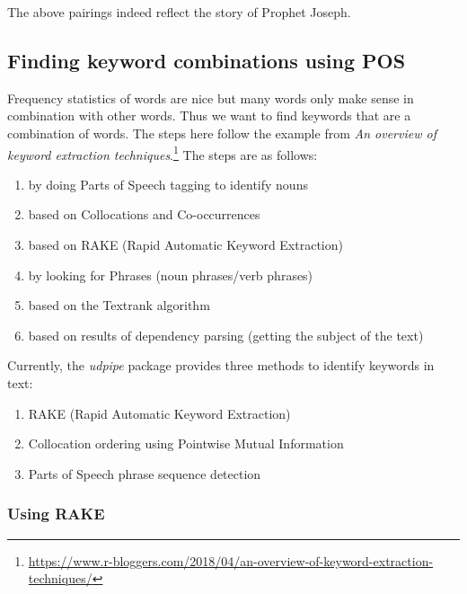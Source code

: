 \documentclass[
]{article}
\providecommand{\tightlist}{%
  \setlength{\itemsep}{0pt}\setlength{\parskip}{0pt}}
\begin{document}
\normalsize

The above pairings indeed reflect the story of Prophet Joseph.

\hypertarget{finding-keyword-combinations-using-POS}{%
\subsection{Finding keyword combinations using POS}\label{finding-keyword-combinations-using-POS}}

Frequency statistics of words are nice but many words only make sense in combination with other words. Thus we want to find keywords that are a combination of words. The steps here follow the example from \emph{An overview of keyword extraction techniques}.\footnote{\url{https://www.r-bloggers.com/2018/04/an-overview-of-keyword-extraction-techniques/}} The steps are as follows:

\begin{enumerate}
\def\labelenumi{\arabic{enumi}.}
\tightlist
\item
  by doing Parts of Speech tagging to identify nouns
\item
  based on Collocations and Co-occurrences
\item
  based on RAKE (Rapid Automatic Keyword Extraction)
\item
  by looking for Phrases (noun phrases/verb phrases)
\item
  based on the Textrank algorithm
\item
  based on results of dependency parsing (getting the subject of the text)
\end{enumerate}

Currently, the \emph{udpipe} package provides three methods to identify keywords in text:

\begin{enumerate}
\def\labelenumi{\arabic{enumi}.}
\tightlist
\item
  RAKE (Rapid Automatic Keyword Extraction)
\item
  Collocation ordering using Pointwise Mutual Information
\item
  Parts of Speech phrase sequence detection
\end{enumerate}

\hypertarget{using-rake}{%
\subsubsection{Using RAKE}\label{using-rake}}
\end{document}
